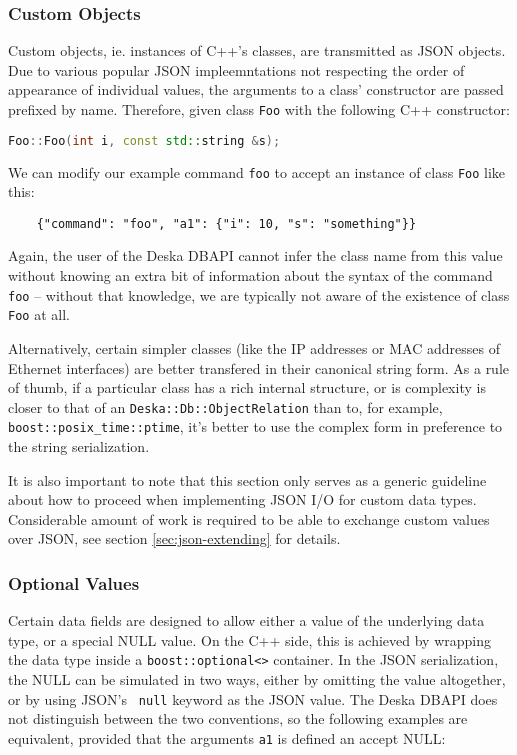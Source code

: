 \documentclass{article}
\begin{document}
\subsubsection{Custom Objects}

Custom objects, ie. instances of C++'s classes, are transmitted as JSON objects. Due to various popular JSON
impleemntations not respecting the order of appearance of individual values, the arguments to a class' constructor are
passed prefixed by name.  Therefore, given class {\tt Foo} with the following C++ constructor:

\begin{lstlisting}[language=c++]
    Foo::Foo(int i, const std::string &s);
\end{lstlisting}

We can modify our example command {\tt foo} to accept an instance of class {\tt Foo} like this:

\begin{lstlisting}
    {"command": "foo", "a1": {"i": 10, "s": "something"}}
\end{lstlisting}

Again, the user of the Deska DBAPI cannot infer the class name from this value without knowing an extra bit of
information about the syntax of the command {\tt foo} -- without that knowledge, we are typically not aware of the
existence of class {\tt Foo} at all.

Alternatively, certain simpler classes (like the IP addresses or MAC addresses of Ethernet interfaces) are better
transfered in their canonical string form.  As a rule of thumb, if a particular class has a rich internal structure, or
is complexity is closer to that of an {\tt Deska::Db::ObjectRelation} than to, for example, {\tt
boost::posix\_time::ptime}, it's better to use the complex form in preference to the string serialization.

It is also important to note that this section only serves as a generic guideline about how to proceed when implementing
JSON I/O for custom data types.  Considerable amount of work is required to be able to exchange custom values over JSON,
see section \ref{sec:json-extending} for details.

\subsubsection{Optional Values}

Certain data fields are designed to allow either a value of the underlying data type, or a special NULL value.  On the
C++ side, this is achieved by wrapping the data type inside a {\tt boost::optional<>} container.  In the JSON
serialization, the NULL can be simulated in two ways, either by omitting the value altogether, or by using JSON's {\tt
null} keyword as the JSON value.  The Deska DBAPI does not distinguish between the two conventions, so the following
examples are equivalent, provided that the arguments {\tt a1} is defined an accept NULL:
\end{document}
